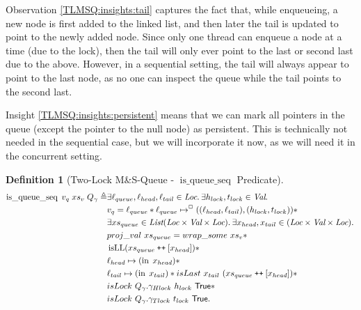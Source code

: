 \documentclass[a4paper, 11pt]{report}
\newtheorem{definition}{Definition}[section]
\newcommand{\isqueueseq}{\operatorname{is\_queue\_seq}}
\newcommand{\isLL}{\operatorname{isLL}}
\newcommand{\nIn}[1]{\operatorname{in} \; #1}
\newcommand\catenate{\mathbin{\text{\ttfamily\upshape ++}}}
\begin{document}
Observation \ref{TLMSQ:insights:tail} captures the fact that, while enqueueing, a new node is first added to the linked list, and then later the tail is updated to point to the newly added node. Since only one thread can enqueue a node at a time (due to the lock), then the tail will only ever point to the last or second last due to the above. However, in a sequential setting, the tail will always appear to point to the last node, as no one can inspect the queue while the tail points to the second last.

Insight \ref{TLMSQ:insights:persistent} means that we can mark all pointers in the queue (except the pointer to the null node) as persistent. This is technically not needed in the sequential case, but we will incorporate it now, as we will need it in the concurrent setting.

\begin{definition}[Two-Lock M\&S-Queue - $\isqueueseq$ Predicate]\label{TLMSQ:spec:isqueueseq}
\begin{align*}
  \isqueueseq \; v_q \; xs_v \; Q_\gname \eqdef &\Exists \loc_{queue}, \loc_{head}, \loc_{tail} \in \Loc . \Exists h_{lock}, t_{lock} \in \Val . \\
  &v_q = \loc_{queue} \star \loc_{queue} \mapsto^{\persistently} ((\loc_{head}, \loc_{tail}), (h_{lock}, t_{lock})) \star\\
  &\Exists xs_{queue} \in \List (\Loc \times \Val \times \Loc) . \Exists x_{head}, x_{tail} \in (\Loc \times \Val \times \Loc) .\\
	&proj\_val \ xs_{queue} = wrap\_some \ xs_v \star\\
	&\isLL (xs_{queue} \catenate [x_{head}]) \star\\
	&\loc_{head} \mapsto (\nIn{x_{head}}) \star\\
	&\loc_{tail} \mapsto (\nIn{x_{tail}}) \star isLast \ x_{tail} \ (xs_{queue} \catenate [x_{head}]) \star\\
	&isLock \ Q_\gname.\gname_{Hlock} \ h_{lock} \ \TRUE \star\\
	&isLock \ Q_\gname.\gname_{Tlock} \ t_{lock} \ \TRUE.
\end{align*}
\end{definition}
\end{document}
